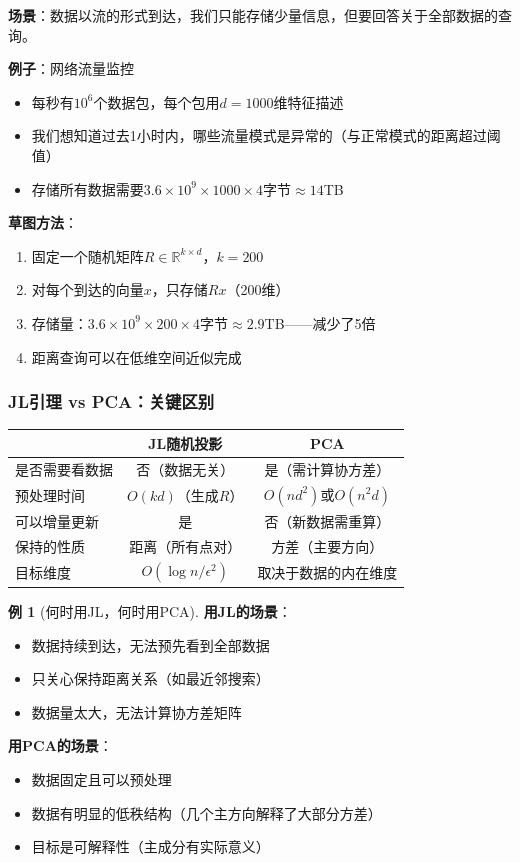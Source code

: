 \documentclass[11pt,a4paper]{ctexart}
\theoremstyle{definition}
\newtheorem{example}[theorem]{例}
\theoremstyle{remark}
\begin{document}
\textbf{场景}：数据以流的形式到达，我们只能存储少量信息，但要回答关于全部数据的查询。

\textbf{例子}：网络流量监控
\begin{itemize}
    \item 每秒有$10^6$个数据包，每个包用$d = 1000$维特征描述
    \item 我们想知道过去1小时内，哪些流量模式是异常的（与正常模式的距离超过阈值）
    \item 存储所有数据需要$3.6 \times 10^9 \times 1000 \times 4$字节$\approx 14$TB
\end{itemize}

\textbf{草图方法}：
\begin{enumerate}
    \item 固定一个随机矩阵$R \in \mathbb{R}^{k \times d}$，$k = 200$
    \item 对每个到达的向量$x$，只存储$Rx$（200维）
    \item 存储量：$3.6 \times 10^9 \times 200 \times 4$字节$\approx 2.9$TB——减少了5倍
    \item 距离查询可以在低维空间近似完成
\end{enumerate}

\subsubsection{JL引理 vs PCA：关键区别}

\begin{center}
\begin{tabular}{|l|c|c|}
\hline
 & JL随机投影 & PCA \\
\hline
是否需要看数据 & 否（数据无关） & 是（需计算协方差） \\
预处理时间 & $O(kd)$（生成$R$） & $O(nd^2)$或$O(n^2d)$ \\
可以增量更新 & 是 & 否（新数据需重算） \\
保持的性质 & 距离（所有点对） & 方差（主要方向） \\
目标维度 & $O(\log n / \epsilon^2)$ & 取决于数据的内在维度 \\
\hline
\end{tabular}
\end{center}

\begin{example}[何时用JL，何时用PCA]
\textbf{用JL的场景}：
\begin{itemize}
    \item 数据持续到达，无法预先看到全部数据
    \item 只关心保持距离关系（如最近邻搜索）
    \item 数据量太大，无法计算协方差矩阵
\end{itemize}

\textbf{用PCA的场景}：
\begin{itemize}
    \item 数据固定且可以预处理
    \item 数据有明显的低秩结构（几个主方向解释了大部分方差）
    \item 目标是可解释性（主成分有实际意义）
\end{itemize}
\end{example}
\end{document}
